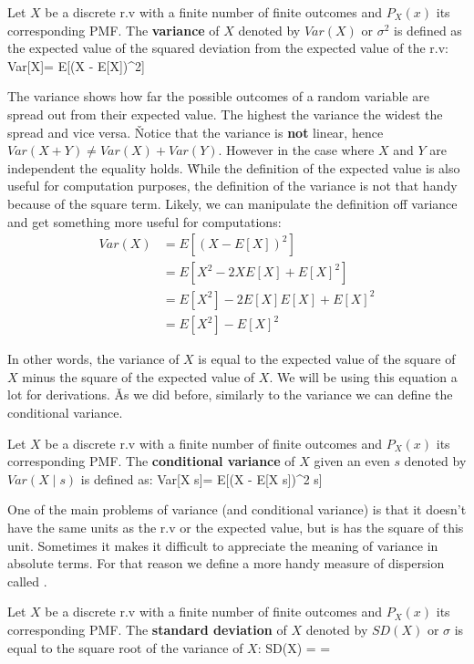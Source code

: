 \bd[Variance]
Let $X$ be a discrete r.v with a finite number of finite outcomes and $P_{X} (x)$ its corresponding PMF. The
\textbf{variance} of $X$ denoted by $Var(X)$ or $\sigma^2$ is defined as the expected value of the squared deviation
from the expected value of the r.v:
\bse
Var[X]= E[(X - E[X])^2]
\ese
\ed

The variance shows how far the possible outcomes of a random variable are spread out from their expected value. The
highest the variance the widest the spread and vice versa. \v

Notice that the variance is \textbf{not} linear, hence $Var(X+Y) \neq Var(X) + Var(Y)$. However in the case where $X$
and $Y$ are independent the equality holds. \v

While the definition of the expected value is also useful for computation purposes, the definition of the variance is
not that handy because of the square term. Likely, we can manipulate the definition off variance and get something
more useful for computations:
\begin{align*}
Var(X) &= E[(X - E[X])^{2}] \\ &= E[X^{2}-2XE[X]+E[X]^{2}] \\ &= E[X^{2}]-2E[X]E[X]+E[X]^{2} \\ &= E[X^{2}] - E[X]^{2}
\end{align*}

In other words, the variance of $X$ is equal to the expected value of the square of $X$ minus the square of the
expected value of $X$. We will be using this equation a lot for derivations. \v

As we did before, similarly to the variance we can define the conditional variance.

Let $X$ be a discrete r.v with a finite number of finite outcomes and $P_{X} (x)$ its corresponding PMF. The
\textbf{conditional variance} of $X$ given an even $s$ denoted by $Var(X \mid s)$ is defined as:
\bse
Var[X \mid s]= E[(X - E[X \mid s])^2 \mid s]
\ese
\ed

One of the main problems of variance (and conditional variance) is that it doesn't have the same units as the r.v or
the expected value, but is has the square of this unit. Sometimes it makes it difficult to appreciate the meaning of
variance in absolute terms. For that reason we define a more handy measure of dispersion called .

Let $X$ be a discrete r.v with a finite number of finite outcomes and $P_{X} (x)$ its corresponding PMF. The
\textbf{standard deviation} of $X$ denoted by $SD(X)$ or $\sigma$ is equal to the square root of the variance of $X$:
\bse
SD(X) =  = 
\ese
\ed

